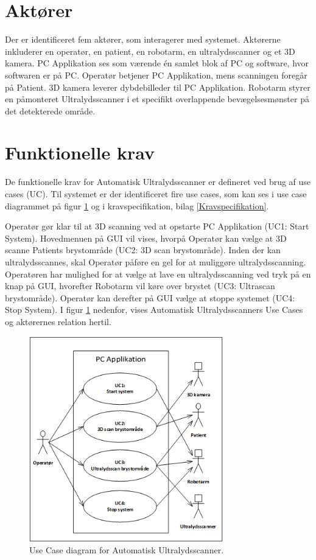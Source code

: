 \section{Aktører}
Der er identificeret fem aktører, som interagerer med systemet. Aktørerne inkluderer en operatør, en patient, en robotarm, en ultralydsscanner og et 3D kamera. PC Applikation ses som værende én samlet blok af PC og software, hvor softwaren er på PC. Operatør betjener PC Applikation, mens scanningen foregår på Patient. 3D kamera leverer dybdebilleder til PC Applikation. Robotarm styrer en påmonteret Ultralydsscanner i et specifikt overlappende bevægelsesmønster på det detekterede område.

\section{Funktionelle krav}
De funktionelle krav for Automatisk Ultralydsscanner er defineret ved brug af use cases (UC). Til systemet er der identificeret fire use cases, som kan ses i use case diagrammet på figur \ref{UseCaseDiagram} og i kravspecifikation, bilag \ref{Kravspecifikation}. 

Operatør gør klar til at 3D scanning ved at opstarte PC Applikation (UC1: Start System). Hovedmenuen på GUI vil vises, hvorpå Operatør kan vælge at 3D scanne Patients brystområde (UC2: 3D scan brystområde). Inden der kan ultralydsscannes, skal Operatør påføre en gel for at muliggøre ultralydsscanning. Operatøren har mulighed for at vælge at lave en ultralydsscanning ved tryk på en knap på GUI, hvorefter Robotarm vil køre over brystet (UC3: Ultrascan brystområde).  Operatør kan derefter på GUI vælge at stoppe systemet (UC4: Stop System). I figur \ref{UseCaseDiagram} nedenfor, vises Automatisk Ultralydsscanners Use Cases og aktørernes relation hertil.

\begin{figure}[H]
    \centering
    \includegraphics[width=0.75\textwidth]{figurer/d/Kravspecifikation/UseCaseDiagram}
    \caption{Use Case diagram for Automatisk Ultralydsscanner.}
    \label{UseCaseDiagram}
\end{figure}

